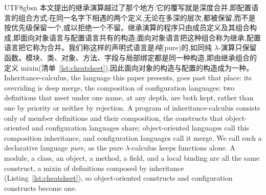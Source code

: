 \begin{CJK*}{UTF8}{gbsn}
\ifPaperChinese
本文提出的继承演算越过了那个地方:它的覆写就是深度合并,即配置语言的组合方式:在同一名字下相遇的两个定义,无论在多深的层次,都被保留,而不是按优先级保留一个,或以拒绝一个不留。继承演算的程序只由成员定义及其组合构成,即面向对象语言与配置语言共有的构造;面向对象语言把这种组合称为继承,配置语言把它称为合并。我们称这样的声明式语言是\emph{纯}(pure)的,如同纯 $\lambda$-演算只保留函数。模块、类、对象、方法、字段与局部绑定都是同一种构造,即由继承组合的定义 mixin(清单~\ref{lst:cheatsheet}),因此面向对象的构造与配置的构造成为一种。
\else
Inheritance-calculus, the language this paper presents, goes past that place: its overriding is deep
merge, the composition of configuration languages: two definitions that
meet under one name, at any depth, are both kept, rather than one by priority or neither by rejection.
A program of inheritance-calculus consists only of member definitions and their composition, the
constructs that object-oriented and configuration languages share; object-oriented languages call this
composition inheritance, and configuration languages call it merge.
We call such a declarative language \emph{pure}, as the pure $\lambda$-calculus keeps functions alone.
A module, a class, an object, a method, a field, and a local binding are all the same construct, a
mixin of definitions composed by inheritance (Listing~\ref{lst:cheatsheet}), so
object-oriented constructs and configuration constructs become one.
\fi


\end{CJK*}
